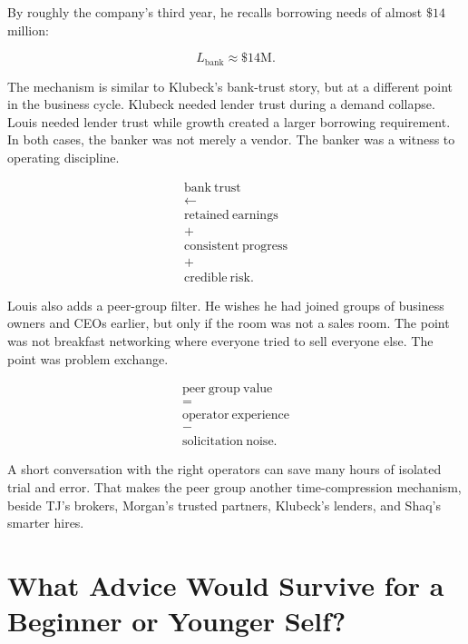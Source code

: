 \documentclass[11pt,oneside]{book}
\begin{document}
By roughly the company's third year, he recalls borrowing needs of almost \(\$14\) million:

\begin{equation}
L_{\mathrm{bank}}\approx \$14\mathrm{M}.
\end{equation}

The mechanism is similar to Klubeck's bank-trust story, but at a different point in the business cycle. Klubeck needed lender trust during a demand collapse. Louis needed lender trust while growth created a larger borrowing requirement. In both cases, the banker was not merely a vendor. The banker was a witness to operating discipline.

\begin{equation}
\begin{gathered}
\mathrm{bank\ trust}\\
\longleftarrow\\
\mathrm{retained\ earnings}\\
+\\
\mathrm{consistent\ progress}\\
+\\
\mathrm{credible\ risk}.
\end{gathered}
\end{equation}

Louis also adds a peer-group filter. He wishes he had joined groups of business owners and CEOs earlier, but only if the room was not a sales room. The point was not breakfast networking where everyone tried to sell everyone else. The point was problem exchange.

\begin{equation}
\begin{gathered}
\mathrm{peer\ group\ value}\\
=\\
\mathrm{operator\ experience}\\
-\\
\mathrm{solicitation\ noise}.
\end{gathered}
\end{equation}

A short conversation with the right operators can save many hours of isolated trial and error. That makes the peer group another time-compression mechanism, beside TJ's brokers, Morgan's trusted partners, Klubeck's lenders, and Shaq's smarter hires.

\chapter{What Advice Would Survive for a Beginner or Younger Self?}
\end{document}
